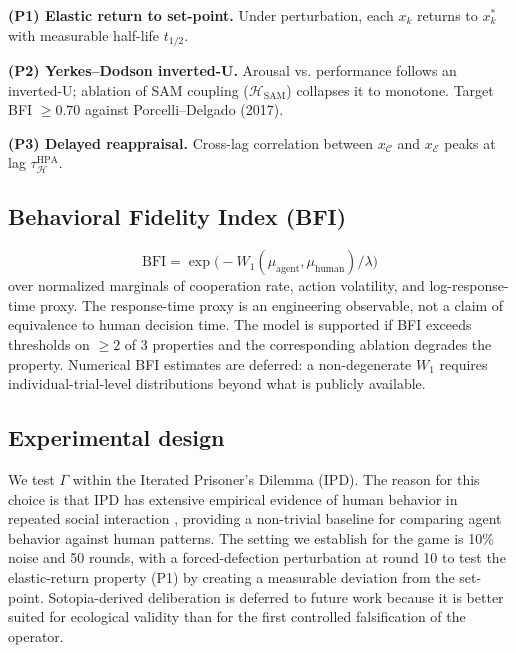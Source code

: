 \documentclass{article}
\begin{document}
\textbf{(P1) Elastic return to set-point.} Under perturbation, each $x_k$ returns to $x^{*}_k$ with measurable half-life $t_{1/2}$.

\textbf{(P2) Yerkes--Dodson inverted-U.} Arousal vs. performance follows an inverted-U; ablation of SAM coupling ($\mathcal{H}_{\text{SAM}}$) collapses it to monotone. Target BFI $\geq 0.70$ against Porcelli--Delgado (2017).

\textbf{(P3) Delayed reappraisal.} Cross-lag correlation between $x_{\mathcal{C}}$ and $x_{\mathcal{E}}$ peaks at lag $\tau_{\mathcal{H}}^{\mathrm{HPA}}$.

\subsection{Behavioral Fidelity Index (BFI)}

\begin{equation}
\mathrm{BFI} = \exp\bigl(-W_1(\mu_{\text{agent}}, \mu_{\text{human}})/\lambda\bigr)
\end{equation}
over normalized marginals of cooperation rate, action volatility, and log-response-time proxy. The response-time proxy is an engineering observable, not a claim of equivalence to human decision time. The model is supported if BFI exceeds thresholds on $\geq 2$ of 3 properties and the corresponding ablation degrades the property. Numerical BFI estimates are deferred: a non-degenerate $W_1$ requires individual-trial-level distributions beyond what is publicly available.

\subsection{Experimental design}

We test $\Gamma$ within the Iterated Prisoner's Dilemma (IPD). The reason for this choice is that IPD has extensive empirical evidence of human behavior in repeated social interaction \citep{axelrod1984evolution,nowak2006evolutionary,porcelli2017stress}, providing a non-trivial baseline for comparing agent behavior against human patterns. The setting we establish for the game is 10\% noise and 50 rounds, with a forced-defection perturbation at round 10 to test the elastic-return property (P1) by creating a measurable deviation from the set-point. Sotopia-derived deliberation \citep{zhou2024sotopia} is deferred to future work because it is better suited for ecological validity than for the first controlled falsification of the operator.
\end{document}
